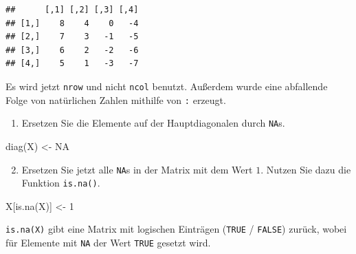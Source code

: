 \documentclass[12pt,a4paper]{article}
\newenvironment{Shaded}{\begin{snugshade}}{\end{snugshade}}
\newcommand{\ConstantTok}[1]{\textcolor[rgb]{0.00,0.00,0.00}{#1}}
\newcommand{\DecValTok}[1]{\textcolor[rgb]{0.00,0.00,0.81}{#1}}
\newcommand{\FunctionTok}[1]{\textcolor[rgb]{0.00,0.00,0.00}{#1}}
\newcommand{\NormalTok}[1]{#1}
\newcommand{\OtherTok}[1]{\textcolor[rgb]{0.56,0.35,0.01}{#1}}
\begin{document}
\begin{verbatim}
##      [,1] [,2] [,3] [,4]
## [1,]    8    4    0   -4
## [2,]    7    3   -1   -5
## [3,]    6    2   -2   -6
## [4,]    5    1   -3   -7
\end{verbatim}

Es wird jetzt \texttt{nrow} und nicht \texttt{ncol} benutzt. Außerdem
wurde eine abfallende Folge von natürlichen Zahlen mithilfe von
\texttt{:} erzeugt.

\begin{enumerate} 
  \item Ersetzen Sie die Elemente auf der Hauptdiagonalen durch \texttt{NA}s. 
\end{enumerate}

\begin{Shaded}
\begin{Highlighting}[]
    \FunctionTok{diag}\NormalTok{(X) }\OtherTok{\textless{}{-}} \ConstantTok{NA}
\end{Highlighting}
\end{Shaded}

\begin{enumerate} \setcounter{enumi}{1}
  \item Ersetzen Sie jetzt alle \texttt{NA}s in der Matrix mit dem Wert $1$. Nutzen Sie dazu die Funktion \texttt{is.na()}.
\end{enumerate}

\begin{Shaded}
\begin{Highlighting}[]
\NormalTok{    X[}\FunctionTok{is.na}\NormalTok{(X)] }\OtherTok{\textless{}{-}} \DecValTok{1}
\end{Highlighting}
\end{Shaded}

\texttt{is.na(X)} gibt eine Matrix mit logischen Einträgen
(\texttt{TRUE} / \texttt{FALSE}) zurück, wobei für Elemente mit
\texttt{NA} der Wert \texttt{TRUE} gesetzt wird.
\end{document}
